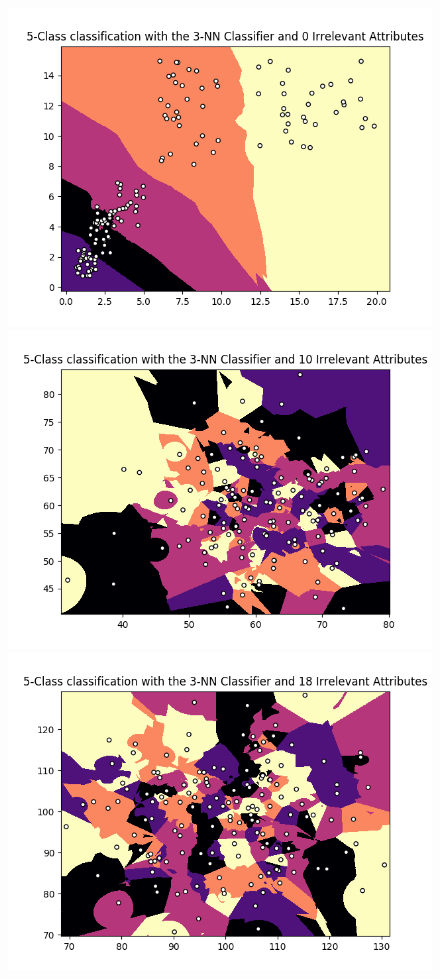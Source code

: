 \documentclass{article}
\begin{document}
\begin{figure}[hbt]
\centering
\includegraphics[scale=0.55]{animals-colormap-1} 
\includegraphics[scale=0.55]{animals-colormap-2}
\includegraphics[scale=0.55]{animals-colormap-3}  

\end{figure}
\end{document}
